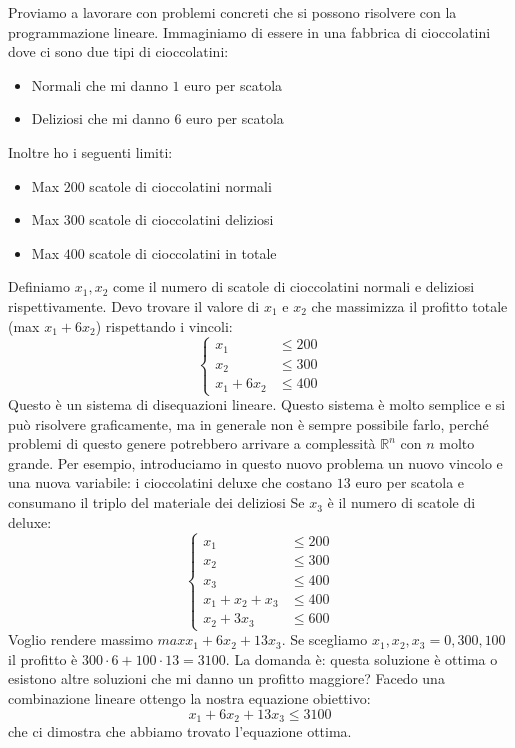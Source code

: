 \documentclass[a4paper]{article}
\begin{document}
Proviamo a lavorare con problemi concreti che si possono risolvere con la programmazione lineare.
Immaginiamo di essere in una fabbrica di cioccolatini dove ci sono due tipi di cioccolatini:
\begin{itemize}
  \item Normali che mi danno $1$ euro per scatola
  \item Deliziosi che mi danno $6$ euro per scatola
\end{itemize}
Inoltre ho i seguenti limiti:
\begin{itemize}
  \item Max $200$ scatole di cioccolatini normali
  \item Max $300$ scatole di cioccolatini deliziosi
  \item Max $400$ scatole di cioccolatini in totale
\end{itemize}
Definiamo $x_1, x_2$ come il numero di scatole di cioccolatini normali e deliziosi rispettivamente. Devo trovare il valore di $x_1$ e $x_2$ che massimizza il profitto totale (max $x_1 + 6x_2$) rispettando i vincoli:
\[
\begin{cases}
  x_1 & \le 200 \\
  x_2 & \le 300 \\
  x_1 + 6x_2 & \le 400
\end{cases}
\]
Questo è un sistema di disequazioni lineare. 
Questo sistema è molto semplice e si può risolvere graficamente, ma in generale non è sempre possibile farlo, perché problemi di questo genere potrebbero 
arrivare a complessità $\mathbb{R}^n$ con $n$ molto grande. 
Per esempio, introduciamo in questo nuovo problema un nuovo vincolo e una nuova variabile: i cioccolatini deluxe che costano $13$ euro per scatola e consumano il triplo del materiale dei deliziosi
Se $x_3$ è il numero di scatole di deluxe:
\[
\begin{cases}
  x_1 & \le 200 \\
  x_2 & \le 300 \\
  x_3 & \le 400 \\
  x_1 + x_2 + x_3 & \le 400\\
  x_2 + 3x_3 & \le 600
\end{cases}
\]
Voglio rendere massimo $max x_1 + 6x_2 + 13x_3$. 
Se scegliamo $x_1, x_2, x_3 = 0,300,100$ il profitto è $300 \cdot 6 + 100 \cdot 13 = 3100$.
La domanda è: questa soluzione è ottima o esistono altre soluzioni che mi danno un profitto maggiore?
Facedo una combinazione lineare ottengo la nostra equazione obiettivo:
\[x_1 + 6x_2 + 13x_3 \le 3100\]
che ci dimostra che abbiamo trovato l'equazione ottima.
\end{document}
